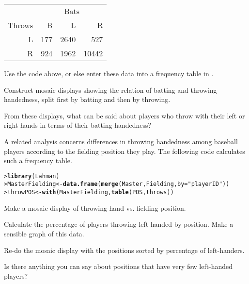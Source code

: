 \documentclass[11pt]{report}\usepackage[]{graphicx}\usepackage[]{color}
\makeatletter
\newcommand{\hlstr}[1]{\textcolor[rgb]{0.192,0.494,0.8}{#1}}%
\newcommand{\hlstd}[1]{\textcolor[rgb]{0.345,0.345,0.345}{#1}}%
\newcommand{\hlkwb}[1]{\textcolor[rgb]{0.69,0.353,0.396}{#1}}%
\newcommand{\hlkwc}[1]{\textcolor[rgb]{0.333,0.667,0.333}{#1}}%
\newcommand{\hlkwd}[1]{\textcolor[rgb]{0.737,0.353,0.396}{\textbf{#1}}}%
\newenvironment{kframe}{%
 \def\at@end@of@kframe{}%
 \ifinner\ifhmode%
  \def\at@end@of@kframe{\end{minipage}}%
  \begin{minipage}{\columnwidth}%
 \fi\fi%
 \def\FrameCommand##1{\hskip\@totalleftmargin \hskip-\fboxsep
 \colorbox{shadecolor}{##1}\hskip-\fboxsep
     \hskip-\linewidth \hskip-\@totalleftmargin \hskip\columnwidth}%
 \MakeFramed {\advance\hsize-\width
   \@totalleftmargin\z@ \linewidth\hsize
   \@setminipage}}%
 {\par\unskip\endMakeFramed%
 \at@end@of@kframe}
\newenvironment{knitrout}{}{} %
\renewenvironment{knitrout}{\small\renewcommand{\baselinestretch}{.85}}{} %
\makeatother
\begin{document}
\begin{Exercises}
\begin{table}[ht]
\centering
\begin{tabular}{r|rrr}
  \hline
       & \multicolumn{3}{c}{Bats} \\
Throws & B & L & R \\ 
  \hline
  L & 177 & 2640 & 527 \\ 
  R & 924 & 1962 & 10442 \\ 
   \hline
\end{tabular}
\end{table}
  \begin{itemize*}
    \item Use the code above, or else enter these data into a frequency table in \R.
    \item Construct mosaic displays showing the relation of batting and throwing handedness, split first by batting and then by throwing.
    \item From these displays, what can be said about players who throw with their left
    or right hands in terms of their batting handedness? 
  \end{itemize*}

\exercise\hard A related analysis concerns differences in throwing handedness among baseball players
according to the fielding position they play.  The following code calculates
such a frequency table.

\begin{knitrout}
\color{fgcolor}\begin{kframe}
\begin{alltt}
\hlstd{> }\hlkwd{library}\hlstd{(Lahman)}
\hlstd{> }\hlstd{MasterFielding} \hlkwb{<-} \hlkwd{data.frame}\hlstd{(}\hlkwd{merge}\hlstd{(Master, Fielding,} \hlkwc{by} \hlstd{=} \hlstr{"playerID"}\hlstd{))}
\hlstd{> }\hlstd{throwPOS} \hlkwb{<-} \hlkwd{with}\hlstd{(MasterFielding,} \hlkwd{table}\hlstd{(POS, throws))}
\end{alltt}
\end{kframe}
\end{knitrout}
  \begin{enumerate*}
    \item Make a mosaic display of throwing hand vs. fielding position.
    \item Calculate the percentage of players throwing left-handed by position.
    Make a sensible graph of this data.
    \item Re-do the mosaic display with the positions sorted by percentage of left-handers.
    \item Is there anything you can say about positions that have very few left-handed
    players?
  \end{enumerate*}



\end{Exercises}
\end{document}
